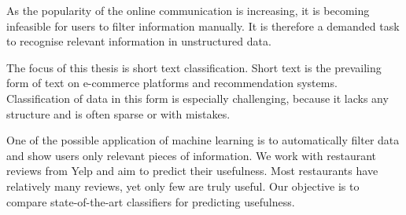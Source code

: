\documentclass[12pt]{report}
\begin{document}

As the popularity of the online communication is increasing,
it is becoming infeasible for users to filter information manually.
It is therefore a demanded task to recognise relevant information in unstructured data.

The focus of this thesis is short text classification.
Short text is the prevailing form of text on e-commerce platforms and recommendation systems.
Classification of data in this form is especially challenging, because it lacks any structure
and is often sparse or with mistakes.

One of the possible application of machine learning is to automatically filter data
and show users only relevant pieces of information.
We work with restaurant reviews from Yelp and aim to predict their usefulness.
Most restaurants have relatively many reviews, yet only few are truly useful.
Our objective is to compare state-of-the-art classifiers for predicting usefulness.
\end{document}
